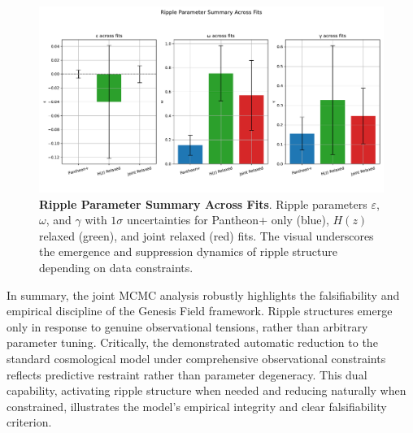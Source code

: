 \begin{figure}[htpb]
\centering
\includegraphics[width=\textwidth]{figures/ripple_parameter_summary.pdf}
\caption{\textbf{Ripple Parameter Summary Across Fits}. Ripple parameters $\varepsilon$, $\omega$, and $\gamma$ with $1\sigma$ uncertainties for Pantheon+ only (blue), $H(z)$ relaxed (green), and joint relaxed (red) fits. The visual underscores the emergence and suppression dynamics of ripple structure depending on data constraints.}
\label{fig:ripple_summary}
\end{figure}

In summary, the joint MCMC analysis robustly highlights the falsifiability and empirical discipline of the Genesis Field framework. Ripple structures emerge only in response to genuine observational tensions, rather than arbitrary parameter tuning. Critically, the demonstrated automatic reduction to the standard cosmological model under comprehensive observational constraints reflects predictive restraint rather than parameter degeneracy. This dual capability, activating ripple structure when needed and reducing naturally when constrained, illustrates the model's empirical integrity and clear falsifiability criterion.

